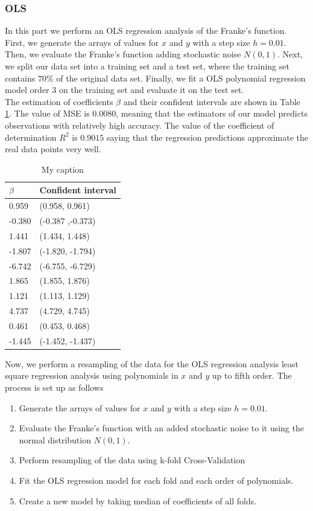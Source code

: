 \documentclass [11pt]{article}
\begin{document}
\subsubsection{OLS}
In this part we perform an OLS regression analysis of the Franke's function. First, we generate the arrays of values for $x$ and $y$ with a step size $h=0.01$. Then, we evaluate the Franke's function adding stochastic noise $N(0,1)$. Next, we split our data set into a training set and a test set, where the training set contains $70\%$ of the original data set. Finally, we fit a OLS polynomial regression model order $3$ on the training set and evaluate it on the test set. \\
The estimation of coefficients $\beta$ and their confident intervals are shown in Table \ref{tab:olsfrane1}. The value of MSE is $0.0080$, meaning that the estimators of our model predicts observations with relatively high accuracy. The value of the coefficient of determination $R^{2}$ is $0.9015$ saying that the regression predictions approximate the real data points very well.
\begin{table}[H]
\centering
\begin{tabular}{ll}
\hline
$\beta$ & Confident interval \\ \hline
0.959   & (0.958, 0.961)     \\
-0.380  & (-0.387 ,-0.373)   \\
1.441   & (1.434, 1.448)     \\
-1.807  & (-1.820,  -1.794)  \\
-6.742  & (-6.755, -6.729)   \\
1.865   & (1.855, 1.876)     \\
1.121   & (1.113, 1.129)     \\
4.737   & (4.729, 4.745)     \\
0.461   & (0.453, 0.468)     \\
-1.445  & (-1.452, -1.437)   \\ \hline
\end{tabular}
\caption{My caption}
\label{tab:olsfrane1}
\end{table}
Now, we perform a resampling of the data for the OLS regression analysis least square regression analysis using polynomials in $x$ and $y$ up to fifth order. The process is set up as follows
\begin{enumerate}
\item Generate the arrays of values for $x$ and $y$ with a step size $h=0.01$. 
\item Evaluate the Franke's function with an added stochastic noise to it using  the normal distribution $N(0,1)$.
\item Perform resampling of the data using k-fold Cross-Validation
\item Fit the OLS regression model for each fold and each order of polynomials.
\item Create a new model by taking median of coefficients of all folds.
\end{enumerate}
\end{document}
